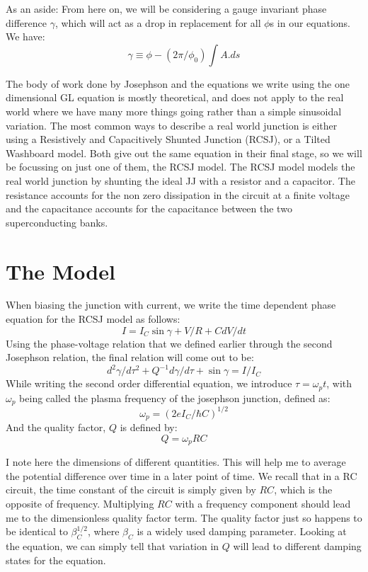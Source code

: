 \documentclass{thesis}
\begin{document}
As an aside: From here on, we will be considering a gauge invariant phase difference $\gamma$, which will act as a drop in replacement for all $\phi$s in our equations. We have:
\begin{equation}
    \gamma \equiv \phi - (2\pi / \phi_0) \int A.ds 
\end{equation}

The body of work done by Josephson and the equations we write using the one dimensional GL equation is mostly theoretical, and does not apply to the real world where we have many more things going rather than a simple sinusoidal variation. The most common ways to describe a real world junction is either using a Resistively and Capacitively Shunted Junction (RCSJ), or a Tilted Washboard model. Both give out the same equation in their final stage, so we will be focussing on just one of them, the RCSJ model. The RCSJ model models the real world junction by shunting the ideal JJ with a resistor and a capacitor. The resistance accounts for the non zero dissipation in the circuit at a finite voltage and the capacitance accounts for the capacitance between the two superconducting banks.

\section{The Model}
When biasing the junction with current, we write the time dependent phase equation for the RCSJ model as follows:
\begin{equation}
    I = I_C \sin\gamma + V/R + C dV/dt
    \label{rcsj1}
\end{equation}
Using the phase-voltage relation that we defined earlier through the second Josephson relation, the final relation will come out to be:
\begin{equation}
    d^2\gamma /d\tau^2 + Q^{-1} d\gamma /d\tau + \sin \gamma = I/I_C
    \label{rcsj}
\end{equation}
While writing the second order differential equation, we introduce $\tau = \omega_p t$, with $\omega_p$ being called the plasma frequency of the josephson junction, defined as:
\begin{equation}
    \omega_p = (2eI_C/\hbar C)^{1/2}
\end{equation}
And the quality factor, $Q$ is defined by:
\begin{equation}
    Q = \omega_p R C
\end{equation}

I note here the dimensions of different quantities. This will help me to average the potential difference over time in a later point of time. We recall that in a RC circuit, the time constant of the circuit is simply given by $RC$, which is the opposite of frequency. Multiplying $RC$ with a frequency component should lead me to the dimensionless quality factor term. The quality factor just so happens to be identical to $\beta_C^{1/2}$, where $\beta_C$ is a widely used damping parameter. Looking at the equation, we can simply tell that variation in $Q$ will lead to different damping states for the equation.
\end{document}

